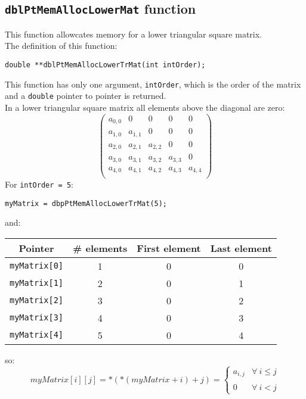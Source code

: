 \subsection{\texttt{dblPtMemAllocLowerMat} function} \label{sec:dblPtMemAllocLowerMat}

This function allowcates memory for a lower triangular square matrix.\\

The definition of this function:
%
\begin{verbatim}
double **dblPtMemAllocLowerTrMat(int intOrder);
\end{verbatim}

This function has only one argument, \texttt{intOrder}, which is the order of the matrix and a \texttt{double} pointer to pointer is returned.\\

In a lower triangular square matrix all elements above the diagonal are zero: 
%
\begin{displaymath}
\left( \begin{array}{ccccc}
  a_{0,0} & 0      & 0      & 0      & 0 \\
  a_{1,0} & a_{1,1} & 0      & 0      & 0 \\ 
  a_{2,0} & a_{2,1} & a_{2,2} & 0      & 0 \\
  a_{3,0} & a_{3,1} & a_{3,2} & a_{3,3} & 0 \\
  a_{4,0} & a_{4,1} & a_{4,2} & a_{4,3} & a_{4,4} \\
\end{array} \right)
\end{displaymath}
%
For \texttt{intOrder = 5}:
%
\begin{verbatim}
myMatrix = dbpPtMemAllocLowerTrMat(5);  
\end{verbatim}
%
and:
\begin{center}
  \begin{tabular}{|c|c|c|c|}
    \hline
    \textbf{Pointer} & \textbf{\# elements} & \textbf{First element} & \textbf{Last element}\\
    \hline
    \texttt{myMatrix[0]} & 1 & 0 & 0\\
    \hline
    \texttt{myMatrix[1]} & 2 & 0 & 1\\
    \hline
    \texttt{myMatrix[2]} & 3 & 0 & 2\\
    \hline
    \texttt{myMatrix[3]} & 4 & 0 & 3\\
    \hline
    \texttt{myMatrix[4]} & 5 & 0 & 4\\
    \hline
  \end{tabular}
\end{center}
%
so:
%
\begin{displaymath}
  myMatrix[i][j] = *(*(myMatrix + i) + j) = \left\{ \begin{array}{ll}
    a_{i,j} & \forall \ i \le j \\
     & \\
    0 & \forall \ i < j
    \end{array} \right.    
\end{displaymath}

